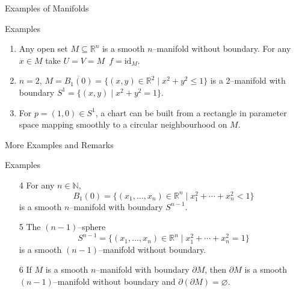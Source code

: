\begin{frame}{Examples of Manifolds}
\begin{exampleblock}{Examples}
\begin{enumerate}
\item Any open set $M\subseteq\mathbb{R}^n$ is a smooth $n$–manifold without boundary. For any $x\in M$ take $U=V=M$\ $f=\mathrm{id}_M$.
\item $n=2$, $M=\overline{B_1(0)}=\{(x,y)\in\mathbb{R}^2\mid x^2+y^2\le1\}$
is a 2–manifold with boundary $S^1=\{(x,y)\mid x^2+y^2=1\}$.
\item For $p=(1,0)\in S^1$, a chart can be built from a rectangle in parameter space mapping smoothly to a circular neighbourhood on $M$.
\end{enumerate}
\end{exampleblock}

\begin{center}
\end{center}
\end{frame}


\begin{frame}{More Examples and Remarks}
\begin{exampleblock}{Examples}
\begin{enumerate}
\item[4] For any $n\in\mathbb{N}$,
\[
B_1(0)=\{(x_1,\dots,x_n)\in\mathbb{R}^n\mid x_1^2+\cdots+x_n^2<1\}
\]
is a smooth $n$–manifold with boundary $S^{n-1}$.
\item[5] The $(n-1)$–sphere
\[
S^{n-1}=\{(x_1,\dots,x_n)\in\mathbb{R}^n\mid x_1^2+\cdots+x_n^2=1\}
\]
is a smooth $(n-1)$–manifold without boundary.
\item[6] If $M$ is a smooth $n$–manifold with boundary $\partial M$, then
$\partial M$ is a smooth $(n-1)$–manifold without boundary and $\partial(\partial M)=\varnothing$.
\end{enumerate}
\end{exampleblock}
\end{frame}



